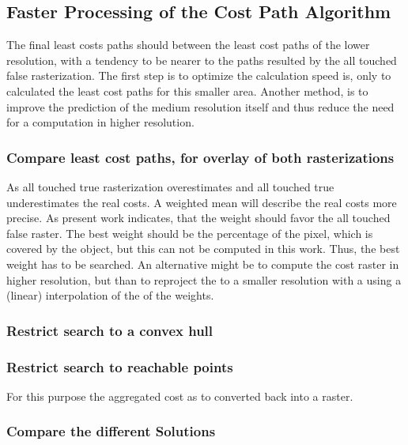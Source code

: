 \documentclass[acmtog]{acmart}
\begin{document}

	\subsection{Faster Processing of the Cost Path Algorithm}\label{subsec:faster-processing-of-the-cost-path-algorithm}

	The final least costs paths should between the least cost paths of the lower resolution, with a tendency to be nearer to the paths resulted by the all touched false rasterization.
	The first step is to optimize the calculation speed is, only to calculated the least cost paths for this smaller area.
	Another method, is to improve the prediction of the medium resolution itself and thus reduce the need for a computation in higher resolution.
	\subsubsection{Compare least cost paths, for overlay of both rasterizations}
	As all touched true rasterization overestimates and all touched true underestimates the real costs.
	A weighted mean will describe the real costs more precise.
	As present work indicates, that the weight should favor the all touched false raster.
	The best weight should be the percentage of the pixel, which is covered by the object, but this can not be computed in this work.
	Thus, the best weight has to be searched.
	An alternative might be to compute the cost raster in higher resolution, but than to reproject the to a smaller resolution with a using a (linear) interpolation of the of the weights.
	\subsubsection{Restrict search to a convex hull}
	\subsubsection{Restrict search to reachable points}
	For this purpose the aggregated cost as to converted back into a raster.

	\subsubsection{Compare the different Solutions}
\end{document}
